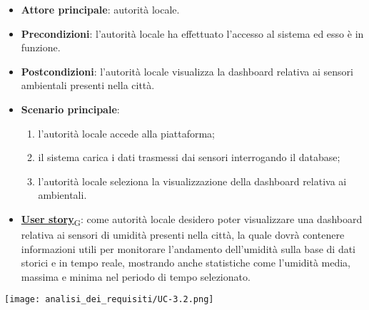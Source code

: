 \begin{itemize}
	\item \textbf{Attore principale}: autorità locale.
	\item \textbf{Precondizioni}: l'autorità locale ha effettuato l'accesso al sistema ed esso è in funzione.
	\item \textbf{Postcondizioni}: l'autorità locale visualizza la dashboard relativa
	      ai sensori ambientali presenti nella città.
	\item \textbf{Scenario principale}:
	      \begin{enumerate}
		      \item l'autorità locale accede alla piattaforma;
		      \item il sistema carica i dati trasmessi dai sensori interrogando il database;
		      \item l'autorità locale seleziona la visualizzazione della dashboard relativa ai ambientali.
	      \end{enumerate}
	\item \href{https://7last.github.io/docs/pb/documentazione-interna/glossario\#user-story}{\textbf{User story}\textsubscript{G}}:
	      come autorità locale desidero poter visualizzare una dashboard relativa ai sensori di umidità presenti nella città, la quale
	      dovrà contenere informazioni utili per monitorare l'andamento dell'umidità sulla base di dati storici e in tempo reale, mostrando
	      anche statistiche come l'umidità media, massima e minima nel periodo di tempo selezionato.
\end{itemize}
\begin{center}
	\texttt{[image: analisi\_dei\_requisiti/UC-3.2.png]}
\end{center}


